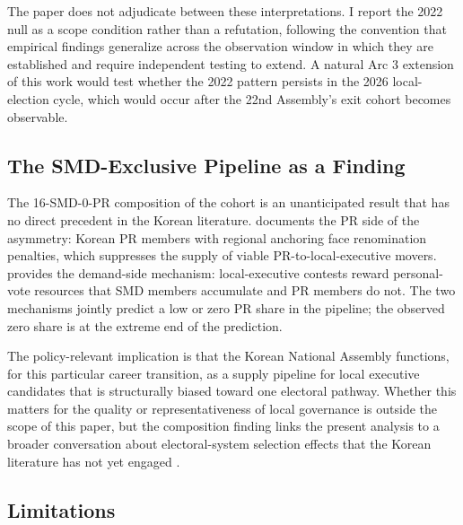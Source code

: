 \documentclass[11pt]{article}
\begin{document}
The paper does not adjudicate between these interpretations. I report the 2022 null as a scope condition rather than a refutation, following the convention that empirical findings generalize across the observation window in which they are established and require independent testing to extend. A natural Arc 3 extension of this work would test whether the 2022 pattern persists in the 2026 local-election cycle, which would occur after the 22nd Assembly's exit cohort becomes observable.

\subsection{The SMD-Exclusive Pipeline as a Finding}

The 16-SMD-0-PR composition of the cohort is an unanticipated result that has no direct precedent in the Korean literature. \citet{im2025} documents the PR side of the asymmetry: Korean PR members with regional anchoring face renomination penalties, which suppresses the supply of viable PR-to-local-executive movers. \citet{careyshugart1995} provides the demand-side mechanism: local-executive contests reward personal-vote resources that SMD members accumulate and PR members do not. The two mechanisms jointly predict a low or zero PR share in the pipeline; the observed zero share is at the extreme end of the prediction.

The policy-relevant implication is that the Korean National Assembly functions, for this particular career transition, as a supply pipeline for local executive candidates that is structurally biased toward one electoral pathway. Whether this matters for the quality or representativeness of local governance is outside the scope of this paper, but the composition finding links the present analysis to a broader conversation about electoral-system selection effects that the Korean literature has not yet engaged \citep{hwang2025, songlee2021}.

\subsection{Limitations}
\end{document}
